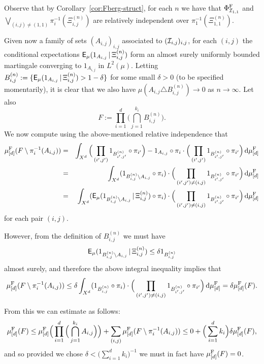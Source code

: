 \documentclass[12pt]{article}
\begin{document}
Observe that by Corollary~\ref{cor:Fberg-struct}, for each $n$ we
have that $\Phi^{\rm{F}}_{\I_{1,1}}$ and $\bigvee_{(i,j)\neq
(1,1)}\pi_i^{-1}(\Xi^{(n)}_{i,j})$ are relatively independent over
$\pi_1^{-1}(\Xi^{(n)}_{1,1})$.

Given now a family of sets $(A_{i,j})_{i,j}$ associated to
$(\I_{i,j})_{i,j}$, for each $(i,j)$ the conditional expectations
$\sfE_\mu(1_{A_{i,j}}\,|\,\Xi^{(n)}_{i,j})$ form an almost surely
uniformly bounded martingale converging to $1_{A_{i,j}}$ in
$L^2(\mu)$. Letting $B^{(n)}_{i,j}:=
\{\sfE_\mu(1_{A_{i,j}}\,|\,\Xi^{(n)}_{i,j})
> 1-\delta\}$ for some small $\delta > 0$ (to be specified
momentarily), it is clear that we also have $\mu(A_{i,j}\triangle
B_{i,j}^{(n)}) \to 0$ as $n\to\infty$.  Let also
\[F := \prod_{i=1}^d\Big(\bigcap_{j=1}^{k_i}B^{(n)}_{i,j}\Big).\] We
now compute using the above-mentioned relative independence that
\begin{eqnarray*}
\mu^{\rm{F}}_{[d]}(F\setminus \pi_i^{-1}(A_{i,j})) &=& \int_{X^d}
\Big(\prod_{(i',j')}1_{B^{(n)}_{i',j'}}\circ\pi_{i'}\Big) - 1_{A_{i,j}}\circ\pi_i\cdot\Big(\prod_{(i',j')}1_{B^{(n)}_{i',j'}}\circ\pi_{i'}\Big)\,\d\mu^{\rm{F}}_{[d]}\\
&=& \int_{X^d} (1_{B^{(n)}_{i,j}\setminus A_{i,j}}\circ\pi_i)\cdot
\Big(\prod_{(i',j')\neq
(i,j)}1_{B^{(n)}_{i',j'}}\circ\pi_{i'}\Big)\,\d\mu^{\rm{F}}_{[d]}\\
&=& \int_{X^d} (\sfE_\mu(1_{B^{(n)}_{i,j}\setminus
A_{i,j}}\,|\,\Xi^{(n)}_{i,j})\circ\pi_i)\cdot
\Big(\prod_{(i',j')\neq
(i,j)}1_{B^{(n)}_{i',j'}}\circ\pi_{i'}\Big)\,\d\mu^{\rm{F}}_{[d]}
\end{eqnarray*}
for each pair $(i,j)$.

However, from the definition of $B^{(n)}_{i,j}$ we must have
\[\sfE_\mu(1_{B^{(n)}_{i,j}\setminus A_{i,j}}\,|\,\Xi^{(n)}_{i,j}) \leq \delta 1_{B^{(n)}_{i,j}}\]
almost surely, and therefore the above integral inequality implies
that \[\mu^{\rm{F}}_{[d]}(F\setminus \pi_i^{-1}(A_{i,j}))\leq
\delta\int_{X^d} (1_{B^{(n)}_{i,j}}\circ\pi_i)\cdot
\Big(\prod_{(i',j')\neq
(i,j)}1_{B^{(n)}_{i',j'}}\circ\pi_{i'}\Big)\,\d\mu^{\rm{F}}_{[d]} =
\delta \mu^{\rm{F}}_{[d]} (F).\]

From this we can estimate as follows: \[\mu^{\rm{F}}_{[d]}(F) \leq
\mu^{\rm{F}}_{[d]}\Big(\prod_{i=1}^d\Big(\bigcap_{j=1}^{k_i}A_{i,j}\Big)\Big)
+ \sum_{(i,j)}\mu^{\rm{F}}_{[d]}(F\setminus \pi_i^{-1}(A_{i,j}))
\leq 0 + \Big(\sum_{i=1}^dk_i\Big)\delta \mu^{\rm{F}}_{[d]} (F),\]
and so provided we chose $\delta < \big(\sum_{i=1}^dk_i\big)^{-1}$
we must in fact have $\mu^{\rm{F}}_{[d]} (F) = 0$.
\end{document}
